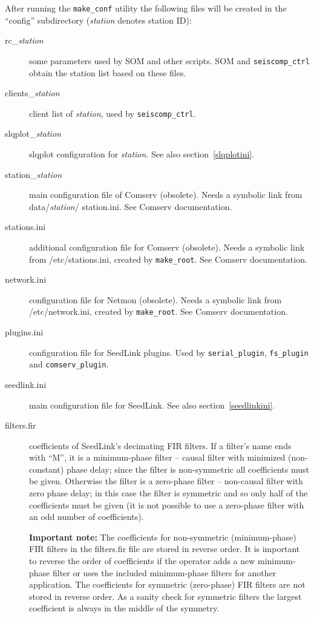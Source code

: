 \documentclass[11pt,a4paper,titlepage]{article}
\begin{document}
After running the \verb+make_conf+ utility the following files will be
created in the ``config'' subdirectory (\textit{station} denotes
station ID):
\begin{description}
\item[rc\_\textit{station}] some parameters used by SOM and other scripts.
SOM and \verb+seiscomp_ctrl+ obtain the station list based on these files.

\item[clients\_\textit{station}] client list of \textit{station}, used by
\verb+seiscomp_ctrl+.

\item[slqplot\_\textit{station}] slqplot configuration for
\textit{station}. See also section~\ref{slqplotini}.

\item[station\_\textit{station}] main configuration file of Comserv
(obsolete). Needs a symbolic link from data/\textit{station}\slash
station.ini. See Comserv documentation.

\item[stations.ini] additional configuration file for Comserv (obsolete).
Needs a symbolic link from /etc\slash stations.ini, created by
\verb+make_root+. See Comserv documentation.

\item[network.ini] configuration file for Netmon (obsolete). Needs a
symbolic link from /etc/network.ini, created by \verb+make_root+. See
Comserv documentation.

\item[plugins.ini] configuration file for SeedLink plugins. Used by
\verb+serial_plugin+, \verb+fs_plugin+ and \verb+comserv_plugin+.

\item[seedlink.ini] main configuration file for SeedLink. See also
section~\ref{seedlinkini}.

\item[filters.fir] coefficients of SeedLink's decimating FIR
filters. If a filter's name ends with ``M'', it is a minimum-phase
filter -- causal filter with minimized (non-constant) phase delay;
since the filter is non-symmetric all coefficients must be
given. Otherwise the filter is a zero-phase filter -- non-causal filter
with zero phase delay; in this case the filter is symmetric and so
only half of the coefficients must be given (it is not possible to use
a zero-phase filter with an odd number of coefficients).

\textbf{Important note:} The coefficients for non-symmetric (minimum-phase)
FIR filters in the filters.fir file are stored in reverse order.  It is
important to reverse the order of coefficients if the operator adds a new
minimum-phase filter or uses the included minimum-phase filters for another
application.  The coefficients for symmetric (zero-phase) FIR filters are
not stored in reverse order.  As a sanity check for symmetric filters the
largest coefficient is always in the middle of the symmetry.


\end{description}
\end{document}
